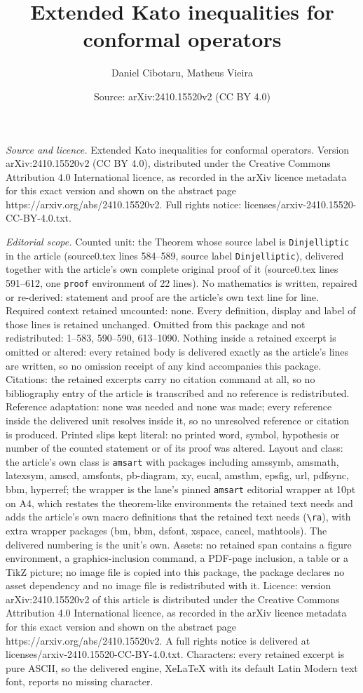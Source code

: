 \documentclass[10pt,a4paper]{amsart}
\title[Extended Kato inequalities for conformal operators]{Extended Kato inequalities for conformal operators}
\author{Daniel Cibotaru, Matheus Vieira}
\date{Source: arXiv:2410.15520v2 (CC BY 4.0)}
\begin{document}
\maketitle

\noindent\emph{Source and licence.} Extended Kato inequalities for conformal operators. Version arXiv:2410.15520v2 (CC BY 4.0), distributed under the Creative Commons Attribution 4.0 International licence, as recorded in the arXiv licence metadata for this exact version and shown on the abstract page https://arxiv.org/abs/2410.15520v2. Full rights notice: licenses/arxiv-2410.15520-CC-BY-4.0.txt.\par\smallskip

\noindent\textit{Editorial scope.} Counted unit: the Theorem whose source label is \texttt{Dinjelliptic} in the article (source0.tex lines 584--589, source label \texttt{Dinjelliptic}), delivered together with the article's own complete original proof of it (source0.tex lines 591--612, one \texttt{proof} environment of 22 lines). No mathematics is written, repaired or re-derived: statement and proof are the article's own text line for line. Required context retained uncounted: none. Every definition, display and label of those lines is retained unchanged. Omitted from this package and not redistributed: 1--583, 590--590, 613--1090. Nothing inside a retained excerpt is omitted or altered: every retained body is delivered exactly as the article's lines are written, so no omission receipt of any kind accompanies this package. Citations: the retained excerpts carry no citation command at all, so no bibliography entry of the article is transcribed and no reference is redistributed. Reference adaptation: none was needed and none was made; every reference inside the delivered unit resolves inside it, so no unresolved reference or citation is produced. Printed slips kept literal: no printed word, symbol, hypothesis or number of the counted statement or of its proof was altered. Layout and class: the article's own class is \texttt{amsart} with packages including amssymb, amsmath, latexsym, amscd, amsfonts, pb-diagram, xy, eucal, amsthm, epsfig, url, pdfsync, bbm, hyperref; the wrapper is the lane's pinned \texttt{amsart} editorial wrapper at 10pt on A4, which restates the theorem-like environments the retained text needs and adds the article's own macro definitions that the retained text needs (\texttt{\textbackslash ra}), with extra wrapper packages (bm, bbm, dsfont, xspace, cancel, mathtools). The delivered numbering is the unit's own. Assets: no retained span contains a figure environment, a graphics-inclusion command, a PDF-page inclusion, a table or a TikZ picture; no image file is copied into this package, the package declares no asset dependency and no image file is redistributed with it. Licence: version arXiv:2410.15520v2 of this article is distributed under the Creative Commons Attribution 4.0 International licence, as recorded in the arXiv licence metadata for this exact version and shown on the abstract page https://arxiv.org/abs/2410.15520v2. A full rights notice is delivered at licenses/arxiv-2410.15520-CC-BY-4.0.txt. Characters: every retained excerpt is pure ASCII, so the delivered engine, XeLaTeX with its default Latin Modern text font, reports no missing character.
\end{document}
